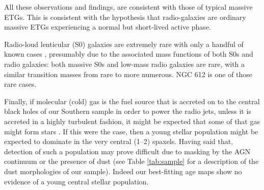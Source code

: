 	All these observations and findings, are consistent with those of typical massive ETGs. This is consistent with the hypothesis that radio-galaxies are ordinary massive ETGs experiencing a normal but short-lived active phase. 

	Radio-loud lenticular (S0) galaxies are extremely rare with only a handful of known cases \citep[e.g.][]{Heckman1982, Morganti2011}, presumably due to the associated mass functions of both S0s and radio galaxies: both massive S0s and low-mass radio galaxies are rare, with a similar transition masses from rare to more numerous. NGC 612 is one of those rare cases.

	Finally, if molecular (cold) gas is the fuel source that is accreted on to the central black holes of our Southern sample in order to power the radio jets, unless it is accreted in a highly turbulent fashion, it might be expected that some of that gas might form stars \citep[e.g.][]{Collin1999, Diamond-Stanic2012, LaMassa2013}. If this were the case, then a young stellar population might be expected to dominate in the very central (1--2) spaxels. Having said that, detection of such a population may prove difficult due to masking by the AGN continuum or the presence of dust (see Table \ref{tab:sample} for a description of the dust morphologies of our sample). Indeed our best-fitting age maps show no evidence of a young central stellar population. 